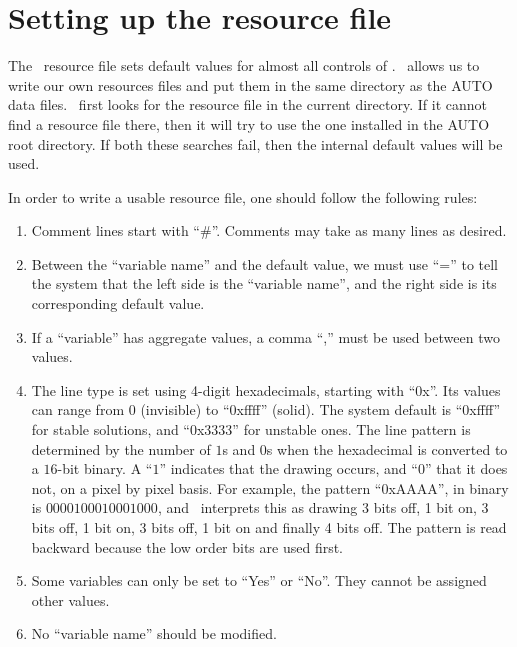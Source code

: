 \section{Setting up the resource file}

The \PLAUT~resource file sets default values for 
almost all controls of \PLAUT. 
\PLAUT~allows us to write our own resources files and put them in the same directory as the AUTO data files. 
\PLAUT~first looks for the resource file in the current directory.
If it cannot find a resource file there, then it will try to use the one installed
in the AUTO root directory. If both these searches fail, then the internal
default values will be used.

In order to write a usable resource file, one should follow the following rules:
\begin{enumerate}
\item Comment lines start with ``\#''. Comments may take as many lines as desired.
\item Between the ``variable name'' and the default value, we must use 
``='' to tell the system that the left side is the ``variable name'', and
the right side is its corresponding default value.
\item If a ``variable'' has aggregate values, a comma ``,'' must be used between
two values.
\item The line type is set using 4-digit hexadecimals, starting with ``0x''. Its values can 
range from $0$ (invisible) to ``0xffff'' (solid). The system default is ``0xffff'' for stable
solutions, and ``0x3333'' for unstable ones. 
The line pattern is determined by the number of $1$s and $0$s when the hexadecimal
is converted to a $16$-bit binary. A ``$1$'' indicates that the drawing occurs, and ``$0$'' that 
it does not, on a pixel by pixel basis. For example, the pattern ``0xAAAA'', 
in binary is $0000100010001000$, and \PLAUT~interprets this as drawing 
3 bits off, 1 bit on, 3 bits off, 1 bit on, 3 bits off, 1 bit on and finally 4 bits off.
The pattern is read backward because the low order bits are used first.
\item Some variables can only be set to ``Yes'' or ``No''. They cannot be assigned other values.
\item No ``variable name'' should be  modified.
\end{enumerate}

